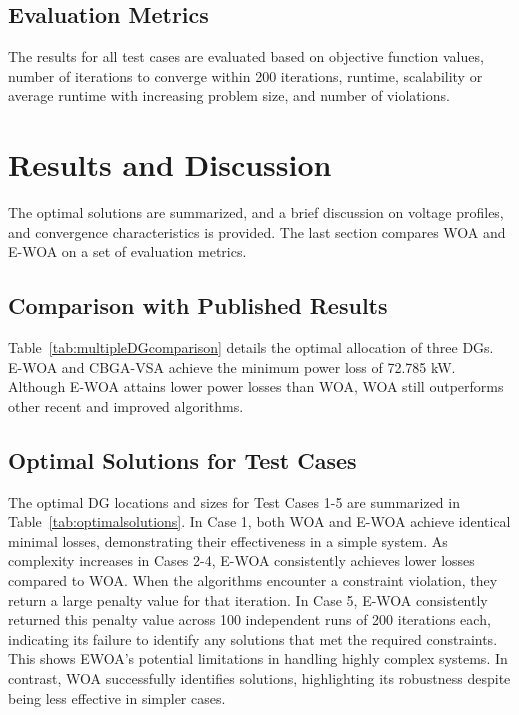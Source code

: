 \documentclass[conference]{IEEEtran}
\begin{document}
\vspace{-15pt}
\subsection{Evaluation Metrics}

The results for all test cases are evaluated based on objective function values, number of iterations to converge within 200 iterations, runtime, scalability or average runtime with increasing problem size, and number of violations.

\section{Results and Discussion}\label{sec:results}
The optimal solutions are summarized, and a brief discussion on voltage profiles, and convergence characteristics is provided. The last section compares WOA and E-WOA on a set of evaluation metrics.

\subsection{Comparison with Published Results}

Table~\ref{tab:multipleDGcomparison} details the optimal allocation of three DGs. E-WOA and CBGA-VSA achieve the minimum power loss of 72.785 kW. Although E-WOA attains lower power losses than WOA, WOA still outperforms other recent and improved algorithms.

\subsection{Optimal Solutions for Test Cases}


The optimal DG locations and sizes for Test Cases 1-5 are summarized in Table~\ref{tab:optimalsolutions}. In Case 1, both WOA and E-WOA achieve identical minimal losses, demonstrating their effectiveness in a simple system. As complexity increases in Cases 2-4, E-WOA consistently achieves lower losses compared to WOA. When the algorithms encounter a constraint violation, they return a large penalty value for that iteration. In Case 5, E-WOA consistently returned this penalty value across 100 independent runs of 200 iterations each, indicating its failure to identify any solutions that met the required constraints. This shows EWOA's potential limitations in handling highly complex systems. In contrast, WOA successfully identifies solutions, highlighting its robustness despite being less effective in simpler cases.
\end{document}
